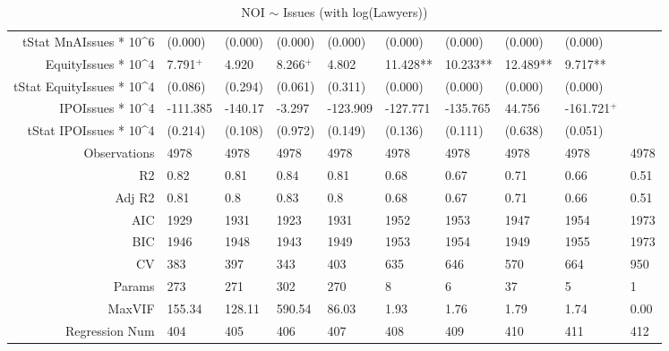 \begin{table}[ht]
\begin{tabular}{rlllllllll}
  tStat MnAIssues * 10^6 & (0.000) & (0.000) & (0.000) & (0.000) & (0.000) & (0.000) & (0.000) & (0.000) &  \\ 
  EquityIssues * 10^4 & 7.791$^{+}$ & 4.920 & 8.266$^{+}$ & 4.802 & 11.428** & 10.233** & 12.489** & 9.717** &  \\ 
  tStat EquityIssues * 10^4 & (0.086) & (0.294) & (0.061) & (0.311) & (0.000) & (0.000) & (0.000) & (0.000) &  \\ 
  IPOIssues * 10^4 & -111.385 & -140.17 & -3.297 & -123.909 & -127.771 & -135.765 & 44.756 & -161.721$^{+}$ &  \\ 
  tStat IPOIssues * 10^4 & (0.214) & (0.108) & (0.972) & (0.149) & (0.136) & (0.111) & (0.638) & (0.051) &  \\ 
  Observations & 4978 & 4978 & 4978 & 4978 & 4978 & 4978 & 4978 & 4978 & 4978 \\ 
  R2 & 0.82 & 0.81 & 0.84 & 0.81 & 0.68 & 0.67 & 0.71 & 0.66 & 0.51 \\ 
  Adj R2 & 0.81 & 0.8 & 0.83 & 0.8 & 0.68 & 0.67 & 0.71 & 0.66 & 0.51 \\ 
  AIC & 1929 & 1931 & 1923 & 1931 & 1952 & 1953 & 1947 & 1954 & 1973 \\ 
  BIC & 1946 & 1948 & 1943 & 1949 & 1953 & 1954 & 1949 & 1955 & 1973 \\ 
  CV & 383 & 397 & 343 & 403 & 635 & 646 & 570 & 664 & 950 \\ 
  Params & 273 & 271 & 302 & 270 & 8 & 6 & 37 & 5 & 1 \\ 
  MaxVIF & 155.34 & 128.11 & 590.54 & 86.03 & 1.93 & 1.76 & 1.79 & 1.74 & 0.00 \\ 
  Regression Num & 404 & 405 & 406 & 407 & 408 & 409 & 410 & 411 & 412 \\ 
   \hline
\end{tabular}
\caption{NOI $\sim$ Issues (with log(Lawyers))} 
\end{table}
